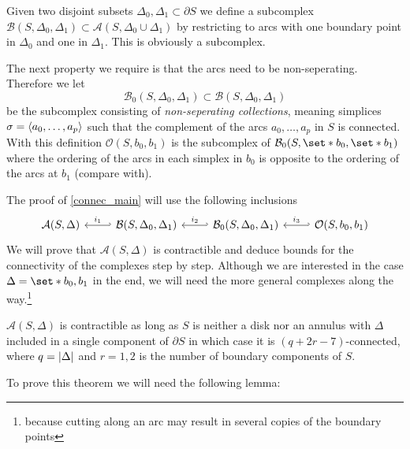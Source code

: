 Given two disjoint subsets $\Delta_0, \Delta_1 \subset \partial S$ we define a subcomplex $\mathcal{B}(S,\Delta_0,\Delta_1) \subset \mathcal{A}(S,\Delta_0 \cup \Delta_1)$ by restricting to arcs with one boundary point in $\Delta_0$ and one in $\Delta_1$.
This is obviously a subcomplex.

The next property we require is that the arcs need to be non-seperating.
Therefore we let 
\[
	\mathcal{B}_0(S,\Delta_0, \Delta_1) \subset \mathcal{B}(S,\Delta_0, \Delta_1) 
\]
be the subcomplex consisting of \emph{non-seperating collections}, meaning simplices $\sigma = \angbrace{a_0, \ldots ,a_p}$ such that the complement of the arcs $a_0, \ldots ,a_p$ in $S$ is connected.
With this definition $\mathcal{O}(S,b_0,b_1)$ is the subcomplex of $\mathcal{B}_0(S,\set*{b_0},\set*{b_1})$ where the ordering of the arcs in each simplex in $b_0$ is opposite to the ordering of the arcs at $b_1$ (compare with).

The proof of \autoref{connec_main} will use the following inclusions
\[
	\begin{tikzcd}
		\mathcal{A}(S,\Delta) & \mathcal{B}(S, \Delta_0, \Delta_1) \lar["i_1"',hook'] & \mathcal{B}_0(S,\Delta_0,\Delta_1) \lar["i_2"',hook'] & \mathcal{O}(S,b_0,b_1) \lar["i_3"',hook']
	\end{tikzcd}
\]
We will prove that $\mathcal{A}(S,\Delta)$ is contractible and deduce bounds for the connectivity of the complexes step by step.
Although we are interested in the case $\Delta=\set*{b_0,b_1}$ in the end, we will need the more general complexes along the way.\footnote{because cutting along an arc may result in several copies of the boundary points}

\begin{theorem}[label=thm:connec_full]
	$\mathcal{A}(S,\Delta)$ is contractible as long as $S$ is neither a disk nor an annulus with $\Delta$ included in a single component of $\partial S$ in which case it is $(q+2r-7)$-connected, where $q=\abs*{\Delta}$ and $r=1,2$ is the number of boundary components of $S$.
\end{theorem}

To prove this theorem we will need the following lemma:


